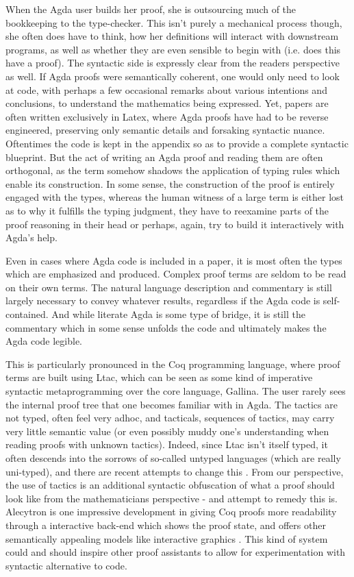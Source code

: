 When the Agda user builds her proof, she is outsourcing much of the bookkeeping
to the type-checker. This isn't purely a mechanical process though, she often
does have to think, how her definitions will interact with downstream programs,
as well as whether they are even sensible to begin with (i.e. does this have a
proof). The syntactic side is expressly clear from the readers perspective as
well. If Agda proofs were semantically coherent, one would only need to look at
code, with perhaps a few occasional remarks about various intentions and
conclusions, to understand the mathematics being expressed. Yet, papers are
often written exclusively in Latex, where Agda proofs have had to be reverse
engineered, preserving only semantic details and forsaking syntactic nuance.
Oftentimes the code is kept in the appendix so as to provide a complete
syntactic blueprint. But the act of writing an Agda proof and reading them are
often orthogonal, as the term somehow shadows the application of typing rules
which enable its construction. In some sense, the construction of the proof is
entirely engaged with the types, whereas the human witness of a large term is
either lost as to why it fulfills the typing judgment, they have to reexamine
parts of the proof reasoning in their head or perhaps, again, try to build it
interactively with Agda's help.

Even in cases where Agda code is included in a paper, it is most often the types
which are emphasized and produced. Complex proof terms are seldom to be read on
their own terms. The natural language description and commentary is still
largely necessary to convey whatever results, regardless if the Agda code is
self-contained. And while literate Agda is some type of bridge, it is still the
commentary which in some sense unfolds the code and ultimately makes the Agda
code legible.

This is particularly pronounced in the Coq programming language, where proof
terms are built using Ltac, which can be seen as some kind of imperative
syntactic metaprogramming over the core language, Gallina. The user rarely sees
the internal proof tree that one becomes familiar with in Agda. The tactics are
not typed, often feel very adhoc, and tacticals, sequences of tactics, may carry
very little semantic value (or even possibly muddy one's understanding when
reading proofs with unknown tactics). Indeed, since Ltac isn't itself typed, it
often descends into the sorrows of so-called untyped languages (which are really
uni-typed), and there are recent attempts to change this \cite{mtac2}
\cite{ltac2}. From our perspective, the use of tactics is an additional syntactic obfuscation
of what a proof should look like from the mathematicians perspective - and
attempt to remedy this is. Alecytron is one impressive development in giving Coq
proofs more readability through a interactive back-end which shows the proof
state, and offers other semantically appealing models like interactive graphics
\cite{coqAlec}. This kind of system could and should inspire other proof
assistants to allow for experimentation with syntactic alternative to code.

